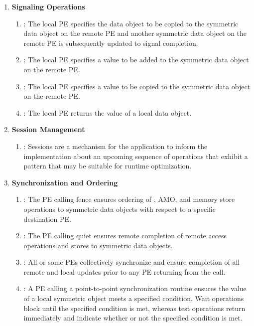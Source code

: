 \begin{enumerate}
\item \textbf{Signaling Operations}
\begin{enumerate}
  \item {}: The local \ac{PE} specifies the \source{} data object
      to be copied to the symmetric data object on the remote \ac{PE} and
      another symmetric data object on the remote \ac{PE} is subsequently
      updated to signal completion.
  \item {}: The local \ac{PE} specifies a value to be added to
      the symmetric data object on the remote \ac{PE}.
  \item {}: The local \ac{PE} specifies a value to be copied to
      the symmetric data object on the remote \ac{PE}.
  \item {}: The local \ac{PE} returns the value of a local data
      object.
\end{enumerate}

\item \textbf{Session Management}
\begin{enumerate}
  \item {}: Sessions are a mechanism for the application to inform
      the implementation about an upcoming sequence of operations that exhibit
      a pattern that may be suitable for runtime optimization.
\end{enumerate}

\item \textbf{Synchronization and Ordering}
\begin{enumerate}
  \item {}: The \ac{PE} calling fence ensures ordering of
  \PUT, \ac{AMO}, and memory store operations
  to symmetric data objects with respect to a specific
      destination \ac{PE}.
  \item {}: The \ac{PE} calling quiet ensures remote completion of remote access
      operations and stores to symmetric data objects.
  \item {}: All or some \acp{PE} collectively synchronize and ensure
      completion of all remote and local updates prior to any \ac{PE} returning
      from the call.
  \item {}: A \ac{PE} calling a point-to-point synchronization
      routine ensures the value of a local symmetric object meets a specified
      condition.  Wait operations block until the specified condition is
      met, whereas test operations return immediately and indicate whether or
      not the specified condition is met.
\end{enumerate}


\end{enumerate}
